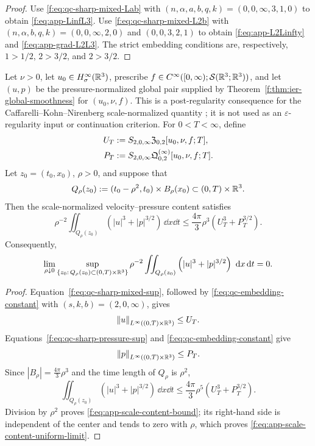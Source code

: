 \begin{proof}
Use \eqref{f:eq:qc-sharp-mixed-Lab} with
\((n,\alpha,a,b,q,k)=(0,0,\infty,3,1,0)\) to obtain
\eqref{f:eq:app-LinfL3}.  Use \eqref{f:eq:qc-sharp-mixed-L2b} with
\((n,\alpha,b,q,k)=(0,0,\infty,2,0)\) and
\((0,0,3,2,1)\) to obtain \eqref{f:eq:app-L2Linfty} and
\eqref{f:eq:app-grad-L2L3}.  The strict embedding conditions are,
respectively, \(1>1/2\), \(2>3/2\), and \(2>3/2\).
\end{proof}

\begin{corollary}
\label{f:thm:app-scale-content-extinction}
Let \(\nu>0\), let \(u_0\in H^\infty_\sigma(\mathbb R^3)\), prescribe
\(f\in C^\infty([0,\infty);\mathcal S(\mathbb R^3;\mathbb R^3))\), and let \((u,p)\) be
the pressure-normalized global pair supplied by
Theorem~\ref{f:thm:ier-global-smoothness} for \((u_0,\nu,f)\).  This is a post-regularity
consequence for the Caffarelli--Kohn--Nirenberg scale-normalized quantity
\cite{CKN1982}; it is not used as an \(\varepsilon\)-regularity input or
continuation criterion.
For \(0<T<\infty\), define
\begin{align}
 U_T&:=S_{2,0,\infty}\mathfrak Z_{0,2}[u_0,\nu,f;T],\notag\\
 P_T&:=S_{2,0,\infty}
 \mathfrak Q^{(\infty)}_{0,2}[u_0,\nu,f;T].
 \label{f:eq:app-scale-content-majorants}
\end{align}
Let \(z_0=(t_0,x_0)\), \(\rho>0\), and suppose that
\[
 Q_\rho(z_0):=(t_0-\rho^2,t_0)\times B_\rho(x_0)
 \subset(0,T)\times\mathbb R^3.
\]
Then the scale-normalized velocity--pressure content satisfies
\begin{equation}
 \rho^{-2}\iint_{Q_\rho(z_0)}
 \left(|u|^3+|p|^{3/2}\right)\,\dd x\dd t
 \le\frac{4\pi}{3}\rho^3
 \left(U_T^3+P_T^{3/2}\right).
 \label{f:eq:app-scale-content-bound}
\end{equation}
Consequently,
\begin{equation}
 \lim_{\rho\downarrow0}
 \sup_{\{z_0:\,Q_\rho(z_0)\subset(0,T)\times\mathbb R^3\}}
 \rho^{-2}\iint_{Q_\rho(z_0)}
 \left(|u|^3+|p|^{3/2}\right)\,\,\mathrm d x\,\mathrm d t=0.
 \label{f:eq:app-scale-content-uniform-limit}
\end{equation}
\end{corollary}

\begin{proof}
Equation~\eqref{f:eq:qc-sharp-mixed-sup}, followed by
\eqref{f:eq:qc-embedding-constant} with \((s,k,b)=(2,0,\infty)\), gives
\[
 \left\lVert u\right\rVert_{L^\infty((0,T)\times\mathbb R^3)}\le U_T.
\]
Equations~\eqref{f:eq:qc-sharp-pressure-sup} and
\eqref{f:eq:qc-embedding-constant} give
\[
 \left\lVert p\right\rVert_{L^\infty((0,T)\times\mathbb R^3)}\le P_T.
\]
Since \(|B_\rho|=\frac{4\pi}{3}\rho^3\) and the time length of
\(Q_\rho\) is \(\rho^2\),
\[
 \iint_{Q_\rho(z_0)}\left(|u|^3+|p|^{3/2}\right)\,\dd x\dd t
 \le\frac{4\pi}{3}\rho^5
 \left(U_T^3+P_T^{3/2}\right).
\]
Division by \(\rho^2\) proves \eqref{f:eq:app-scale-content-bound}; its
right-hand side is independent of the center and tends to zero with
\(\rho\), which proves \eqref{f:eq:app-scale-content-uniform-limit}.
\end{proof}

